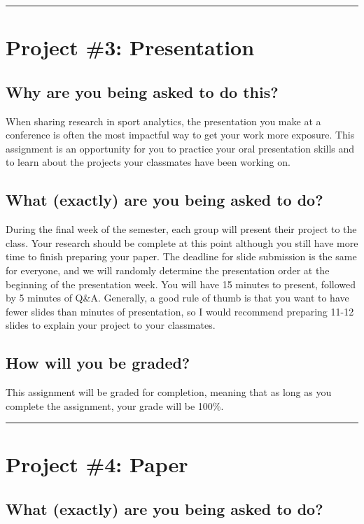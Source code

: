 \documentclass{article}
\begin{document}
  \hrule
  \section*{\sc Project \#3: Presentation}

    \subsection*{\sc Why are you being asked to do this?}

      When sharing research in sport analytics, the presentation you make at a conference is often the most impactful way to get your work more exposure. This assignment is an opportunity for you to practice your oral presentation skills and to learn about the projects your classmates have been working on.
    
    \subsection*{\sc What (exactly) are you being asked to do?}

      During the final week of the semester, each group will present their project to the class. Your research should be complete at this point although you still have more time to finish preparing your paper. The deadline for slide submission is the same for everyone, and we will randomly determine the presentation order at the beginning of the presentation week. You will have 15 minutes to present, followed by 5 minutes of Q\&A. Generally, a good rule of thumb is that you want to have fewer slides than minutes of presentation, so I would recommend preparing 11-12 slides to explain your project to your classmates.

    \subsection*{\sc How will you be graded?}

      This assignment will be graded for completion, meaning that as long as you complete the assignment, your grade will be 100\%.\\

  \hrule
  \section*{\sc Project \#4: Paper}

    \subsection*{\sc What (exactly) are you being asked to do?}
\end{document}
